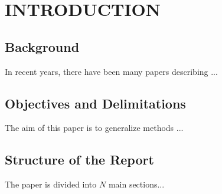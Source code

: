 \section{ INTRODUCTION }
\setlength{\parskip}{3ex}

\subsection{ Background }
In recent years, there have been many papers describing ...

\subsection{ Objectives and Delimitations }
The aim of this paper is to generalize methods ...

\subsection{ Structure of the Report }
The paper is divided into $N$ main sections...